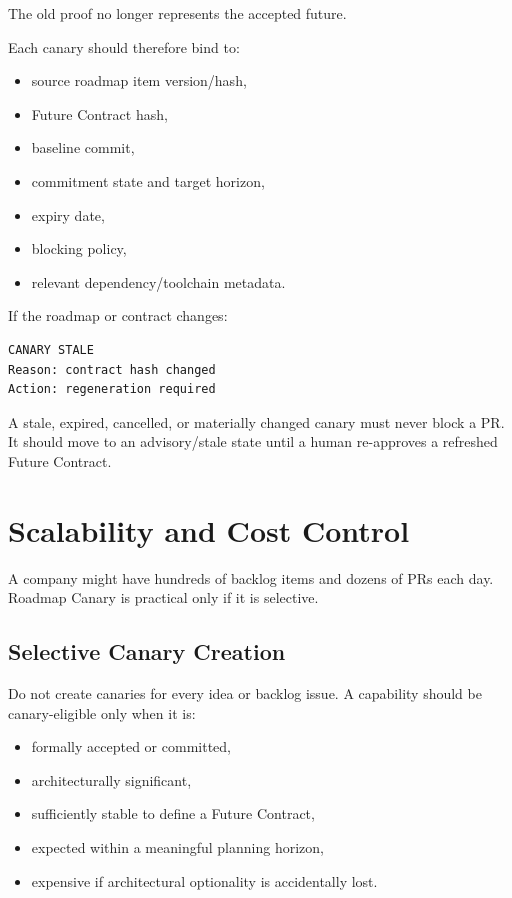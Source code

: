 \documentclass[12pt]{article}
\begin{document}
The old proof no longer represents the accepted future.

Each canary should therefore bind to:

\begin{itemize}
    \item source roadmap item version/hash,
    \item Future Contract hash,
    \item baseline commit,
    \item commitment state and target horizon,
    \item expiry date,
    \item blocking policy,
    \item relevant dependency/toolchain metadata.
\end{itemize}

If the roadmap or contract changes:

\begin{lstlisting}
CANARY STALE
Reason: contract hash changed
Action: regeneration required
\end{lstlisting}

A stale, expired, cancelled, or materially changed canary must never block a PR. It should move to an advisory/stale state until a human re-approves a refreshed Future Contract.

\section{Scalability and Cost Control}

A company might have hundreds of backlog items and dozens of PRs each day. Roadmap Canary is practical only if it is selective.

\subsection{Selective Canary Creation}

Do not create canaries for every idea or backlog issue. A capability should be canary-eligible only when it is:

\begin{itemize}
    \item formally accepted or committed,
    \item architecturally significant,
    \item sufficiently stable to define a Future Contract,
    \item expected within a meaningful planning horizon,
    \item expensive if architectural optionality is accidentally lost.
\end{itemize}
\end{document}
